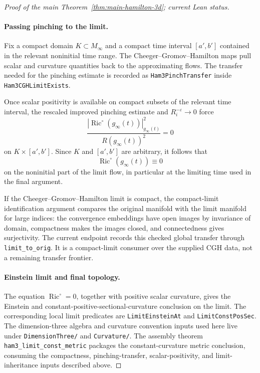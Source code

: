 \documentclass[11pt]{article}
\theoremstyle{plain}
\theoremstyle{definition}
\theoremstyle{remark}
\newcommand{\Ric}{\operatorname{Ric}}
\newcommand{\norm}[1]{\left|#1\right|}
\newcommand{\eps}{\varepsilon}
\newcommand{\leanref}[1]{\nolinkurl{#1}}
\newcommand{\leanfile}[1]{\nolinkurl{#1}}
\newcommand{\rfdir}[1]{\leanfile{#1/}}
\begin{document}
\begin{proof}[Proof of the main Theorem~\ref{thm:main-hamilton-3d}; current Lean status]
\paragraph{Passing pinching to the limit.}
Fix a compact domain \(K\subset M_\infty\) and a compact time interval
\([a',b']\) contained in the relevant noninitial time range.  The
Cheeger--Gromov--Hamilton maps pull scalar and curvature quantities back to the
approximating flows.  The transfer needed for the pinching estimate is recorded
as \leanref{Ham3PinchTransfer} inside \leanref{Ham3CGHLimitExists}.

Once scalar positivity is available on compact subsets of the relevant time
interval, the rescaled improved pinching estimate and \(R_i^{-\eps}\to0\) force
\[
  \frac{\norm{\Ric^\circ(g_\infty(t))}_{g_\infty(t)}^2}
       {R(g_\infty(t))^2}=0
\]
on \(K\times[a',b']\).  Since \(K\) and \([a',b']\) are arbitrary, it follows
that
\[
\Ric^\circ(g_\infty(t))\equiv0
\]
on the noninitial part of the limit flow, in particular at the limiting time
used in the final argument.

If the Cheeger--Gromov--Hamilton limit is compact, the compact-limit
identification argument compares the original manifold with the limit manifold
for large indices: the convergence embeddings have open images by invariance of
domain, compactness makes the images closed, and connectedness gives
surjectivity.  The current endpoint records this checked global transfer through
\leanref{limit_to_orig}.  It is a compact-limit consumer over the supplied CGH
data, not a remaining transfer frontier.

\paragraph{Einstein limit and final topology.}
The equation \(\Ric^\circ=0\), together with positive scalar curvature, gives
the Einstein and constant-positive-sectional-curvature conclusion on the limit.
The corresponding local limit predicates are \leanref{LimitEinsteinAt} and
\leanref{LimitConstPosSec}.  The dimension-three algebra and curvature
convention inputs used here live under \rfdir{DimensionThree} and
\rfdir{Curvature}.  The assembly theorem \leanref{ham3_limit_const_metric}
packages the constant-curvature metric conclusion, consuming the compactness,
pinching-transfer, scalar-positivity, and limit-inheritance inputs described
above.


\end{proof}
\end{document}
